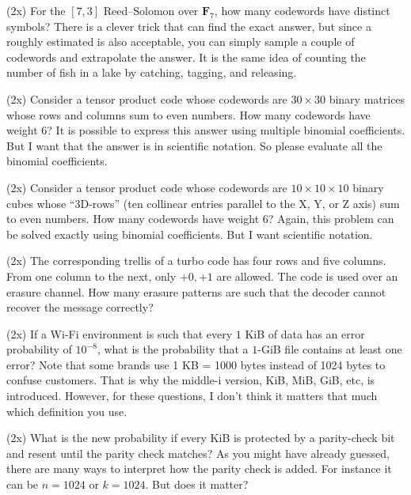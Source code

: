 \documentclass[a4paper]{article}
\def\FF{\mathbf F}
\begin{document}

\Problem{3em} (2x)
For the $[7, 3]$ Reed--Solomon over $\FF_7$,
how many codewords have distinct symbols?
There is a clever trick that can find the exact answer,
but since a roughly estimated is also acceptable,
you can simply sample a couple of codewords and extrapolate the answer.
It is the same idea of counting the number of fish in a lake
by catching, tagging, and releasing.

\Problem{3em} (2x)
Consider a tensor product code whose codewords are
$30 \times 30$ binary matrices whose rows and columns sum to even numbers.
How many codewords have weight $6$?
It is possible to express this answer using multiple binomial coefficients.
But I want that the answer is in scientific notation.
So please evaluate all the binomial coefficients.

\Problem{3em} (2x)
Consider a tensor product code whose codewords are
$10 \times 10 \times 10$ binary cubes whose ``3D-rows''
(ten collinear entries parallel to the X, Y, or Z axis)
sum to even numbers.
How many codewords have weight $6$?
Again, this problem can be solved exactly using binomial coefficients.
But I want scientific notation.

\Problem{3em} (2x)
The corresponding trellis of a turbo code
has four rows and five columns.
From one column to the next, only $+0, +1$ are allowed.
The code is used over an erasure channel.
How many erasure patterns are such that
the decoder cannot recover the message correctly?


\Problem{3em} (2x)
If a Wi-Fi environment is such that
every $1$ KiB of data has an error probability of $10^{-8}$,
what is the probability that a $1$-GiB file contains at least one error?
Note that some brands use 1 KB = 1000 bytes instead of 1024 bytes
to confuse customers.
That is why the middle-i version, KiB, MiB, GiB, etc, is introduced.
However, for these questions,
I don't think it matters that much which definition you use.

\Problem{3em} (2x)
What is the new probability if every KiB is protected by a parity-check bit
and resent until the parity check matches?
As you might have already guessed,
there are many ways to interpret how the parity check is added.
For instance it can be $n = 1024$ or $k = 1024$.
But does it matter?
\end{document}
